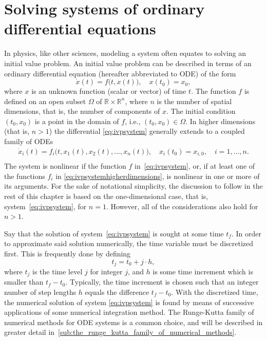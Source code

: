 \section[Solving systems of ordinary differential equations]%
{Solving systems of ordinary differential eq\hspace{0em}uations}
\label{sec:solvingsystems}

In physics, like other sciences, modeling a system often equates to solving
an initial value problem. An initial value problem can be described in terms
of an ordinary differential equation (hereafter abbreviated to ODE) of the form
\begin{equation}
    \label{eq:ivpsystem}
    \dot{x}(t) = f\big(t,x(t)\big),\quad{}x(t_{0})=x_{0},
\end{equation}
where $x$ is an unknown function (scalar or vector) of time $t$. The function
$f$ is defined on an open subset $\Omega$ of $\mathbb{R}\times\mathbb{R}^{n}$,
where $n$ is the number of spatial dimensions, that is, the number of components
of $x$. The initial condition $(t_{0},x_{0})$ is a point in the domain of $f$,
i.e., $(t_{0},x_{0})\in\Omega$. In higher dimensions (that is, $n>1$) the
differential \cref{eq:ivpsystem} generally extends to a coupled
family of ODEs
\begin{equation}
\label{eq:ivpsystemhigherdimensions}
\begin{gathered}
    \dot{x}_{i}(t) = f_{i}\big(t,x_{1}(t),x_{2}(t),\ldots,x_{n}(t)\big),\quad
    x_{i}(t_{0})=x_{i,0},\quad{}i=1,\ldots,n. \\
\end{gathered}
\end{equation}
The system is nonlinear if the function $f$ in~\cref{eq:ivpsystem},
or, if at least one of the functions $f_{i}$ in
\cref{eq:ivpsystemhigherdimensions}, is nonlinear in one or more of its
arguments. For the sake of notational simplicity, the discussion to follow
in the rest of this chapter is based on the one-dimensional case, that is,
system~\eqref{eq:ivpsystem}, for $n=1$. However, all of the considerations also
hold for $n>1$.

Say that the solution of system~\eqref{eq:ivpsystem} is sought at some time
$t_{f}$. In order to approximate said solution numerically, the time variable
must be discretized first. This is frequently done by defining
\begin{equation}
    \label{eq:discretetime}
    t_{j} = t_{0}+j\cdot{}h,
\end{equation}
where $t_{j}$ is the time level $j$ for integer $j$, and $h$ is some time
increment which is smaller than $t_{f}-t_{0}$. Typically, the time increment
is chosen such that an integer number of step lengths $h$ equals the difference
$t_{f}-t_{0}$. With the discretized time, the numerical solution of system
\eqref{eq:ivpsystem} is found by means of successive applications of some
numerical integration method. The Runge-Kutta family of numerical
methods for ODE systems is a common choice, and will be described in
greater detail in~\cref{sub:the_runge_kutta_family_of_numerical_methods}.

